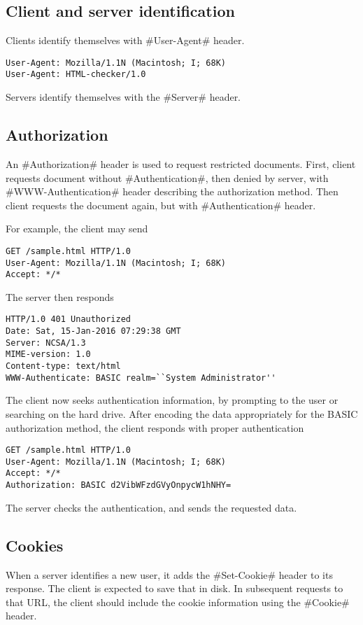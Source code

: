 \documentclass[a4paper]{article}
\begin{document}
\subsection{Client and server identification}

Clients identify themselves with #User-Agent# header.
\begin{verbatim}
User-Agent: Mozilla/1.1N (Macintosh; I; 68K)
User-Agent: HTML-checker/1.0
\end{verbatim}

Servers identify themselves with the #Server# header.

\subsection{Authorization}

An #Authorization# header is used to request restricted documents.
First, client requests document without #Authentication#,
then denied by server, with #WWW-Authentication# header describing the authorization method.
Then client requests the document again, but with #Authentication# header.

For example, the client may send
\begin{verbatim}
GET /sample.html HTTP/1.0
User-Agent: Mozilla/1.1N (Macintosh; I; 68K)
Accept: */*
\end{verbatim}
The server then responds
\begin{verbatim}
HTTP/1.0 401 Unauthorized
Date: Sat, 15-Jan-2016 07:29:38 GMT
Server: NCSA/1.3
MIME-version: 1.0
Content-type: text/html
WWW-Authenticate: BASIC realm=``System Administrator''
\end{verbatim}
The client now seeks authentication information,
by prompting to the user or searching on the hard drive.
After encoding the data appropriately for the BASIC authorization method,
the client responds with proper authentication
\begin{verbatim}
GET /sample.html HTTP/1.0
User-Agent: Mozilla/1.1N (Macintosh; I; 68K)
Accept: */*
Authorization: BASIC d2VibWFzdGVyOnpycW1hNHY=
\end{verbatim}
The server checks the authentication, and sends the requested data.

\subsection{Cookies}
When a server identifies a new user, it adds the #Set-Cookie# header to its response.
The client is expected to save that in disk.
In subsequent requests to that URL,
the client should include the cookie information using the #Cookie# header.
\end{document}
